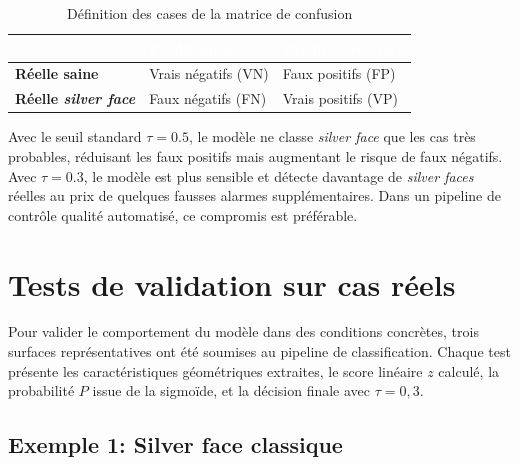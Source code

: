 \begin{table}[H]
    \centering
    \caption{Définition des cases de la matrice de confusion}
    \label{tab:confusion-matrix-def}
    \begin{tabularx}{\textwidth}{|X|>{\centering\arraybackslash}p{4cm}|>{\centering\arraybackslash}p{4.5cm}|}
        \hline
        \rowcolor{headerblue}
        \textcolor{white}{\textbf{}} &
        \textcolor{white}{\textbf{Prédit saine}} &
        \textcolor{white}{\textbf{Prédit \textit{silver face}}} \tabularnewline
        \hline
        \rowcolor{rowlight}
        \textbf{Réelle saine} & Vrais négatifs (VN) & Faux positifs (FP) \\
        \hline
        \rowcolor{rowwhite}
        \textbf{Réelle \textit{silver face}} & Faux négatifs (FN) & Vrais positifs (VP) \\
        \hline
    \end{tabularx}
\end{table}

Avec le seuil standard $\tau = 0.5$, le modèle ne classe \textit{silver face} que les cas très probables, réduisant les faux positifs mais augmentant le risque de faux négatifs. Avec $\tau = 0.3$, le modèle est plus sensible et détecte davantage de \textit{silver faces} réelles au prix de quelques fausses alarmes supplémentaires. Dans un pipeline de contrôle qualité automatisé, ce compromis est préférable.

\section{Tests de validation sur cas réels}
\label{sec:tests-validation}

Pour valider le comportement du modèle dans des conditions concrètes, trois surfaces représentatives ont été soumises au pipeline de classification. Chaque test présente les caractéristiques géométriques extraites, le score linéaire $z$ calculé, la probabilité $P$ issue de la sigmoïde, et la décision finale avec $\tau = 0{,}3$.

\subsection{Exemple 1: Silver face classique}
\label{subsec:test1}

